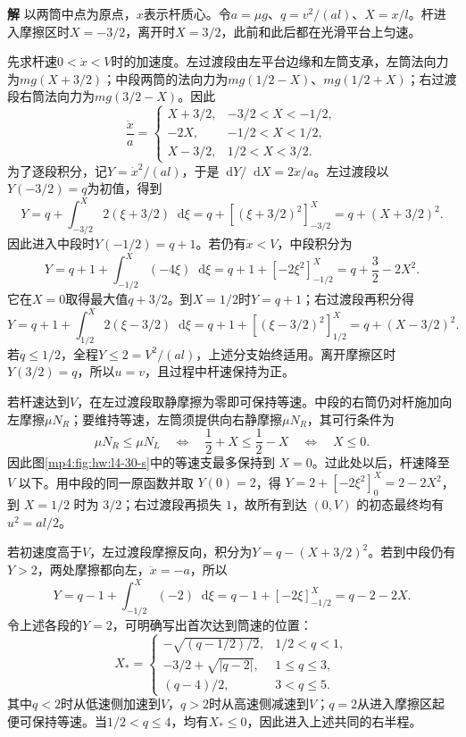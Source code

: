 \documentclass[11pt,openany,fontset=fandol]{ctexbook}
\theoremstyle{definition}\newtheorem{example}{例}[chapter]\newtheorem{exercise}{习题}[chapter]
\newcommand{\SolutionStart}{\par\medskip\ifdim\pagetotal>0pt\ifdim\dimexpr\pagegoal-\pagetotal\relax<3\baselineskip\newpage\fi\fi\noindent\textbf{解}\quad\ignorespaces}
\newenvironment{solution}{\SolutionStart}{\par\medskip}
\newcommand{\dd}{\mathop{}\!\mathrm d}\newcommand{\ee}{\mathrm e}\newcommand{\vct}[1]{\bm{#1}}
\begin{document}
\begin{solution}
以两筒中点为原点，$x$表示杆质心。令$a=\mu g$、$q=v^2/(al)$、$X=x/l$。杆进入摩擦区时$X=-3/2$，离开时$X=3/2$，此前和此后都在光滑平台上匀速。

先求杆速$0<\dot x<V$时的加速度。左过渡段由左平台边缘和左筒支承，左筒法向力为$mg(X+3/2)$；中段两筒的法向力为$mg(1/2-X)$、$mg(1/2+X)$；右过渡段右筒法向力为$mg(3/2-X)$。因此
\[
 \frac{\ddot x}{a}=\begin{cases}
 X+3/2,&-3/2<X<-1/2,\\
 -2X,&-1/2<X<1/2,\\
 X-3/2,&1/2<X<3/2.
 \end{cases}
\]
为了逐段积分，记$Y=\dot x^2/(al)$，于是$\dd Y/\dd X=2\ddot x/a$。左过渡段以$Y(-3/2)=q$为初值，得到
\[
Y=q+\int_{-3/2}^{X}2(\xi+3/2)\dd\xi
=q+[(\xi+3/2)^2]_{-3/2}^{X}
=q+(X+3/2)^2.
\]
因此进入中段时$Y(-1/2)=q+1$。若仍有$\dot x<V$，中段积分为
\[
Y=q+1+\int_{-1/2}^{X}(-4\xi)\dd\xi
=q+1+[-2\xi^2]_{-1/2}^{X}
=q+\frac32-2X^2.
\]
它在$X=0$取得最大值$q+3/2$。到$X=1/2$时$Y=q+1$；右过渡段再积分得
\[
Y=q+1+\int_{1/2}^{X}2(\xi-3/2)\dd\xi
=q+1+[(\xi-3/2)^2]_{1/2}^{X}
=q+(X-3/2)^2.
\]
若$q\le1/2$，全程$Y\le2=V^2/(al)$，上述分支始终适用。离开摩擦区时$Y(3/2)=q$，所以$u=v$，且过程中杆速保持为正。

若杆速达到$V$，在左过渡段取静摩擦为零即可保持等速。中段的右筒仍对杆施加向左摩擦$\mu N_R$；要维持等速，左筒须提供向右静摩擦$\mu N_R$，其可行条件为
\[
\mu N_R\le\mu N_L
\quad\Longleftrightarrow\quad
\frac12+X\le\frac12-X
\quad\Longleftrightarrow\quad X\le0.
\]
因此图\ref{mp4:fig:hw:l4-30-s}中的等速支最多保持到 $X=0$。过此处以后，杆速降至 $V$ 以下。用中段的同一原函数并取 $Y(0)=2$，得 $Y=2+[-2\xi^2]_0^X=2-2X^2$，到 $X=1/2$ 时为 $3/2$；右过渡段再损失 $1$，故所有到达 $(0,V)$ 的初态最终均有 $u^2=al/2$。

若初速度高于$V$，左过渡段摩擦反向，积分为$Y=q-(X+3/2)^2$。若到中段仍有$Y>2$，两处摩擦都向左，$\ddot x=-a$，所以
\[
Y=q-1+\int_{-1/2}^{X}(-2)\dd\xi
=q-1+[-2\xi]_{-1/2}^{X}=q-2-2X.
\]
令上述各段的$Y=2$，可明确写出首次达到筒速的位置：
\[
X_*=\begin{cases}
-\sqrt{(q-1/2)/2},&1/2<q<1,\\
-3/2+\sqrt{|q-2|},&1\le q\le3,\\
(q-4)/2,&3<q\le5.
\end{cases}
\]
其中$q<2$时从低速侧加速到$V$，$q>2$时从高速侧减速到$V$；$q=2$从进入摩擦区起便可保持等速。当$1/2<q\le4$，均有$X_*\le0$，因此进入上述共同的右半程。


\end{solution}
\end{document}

